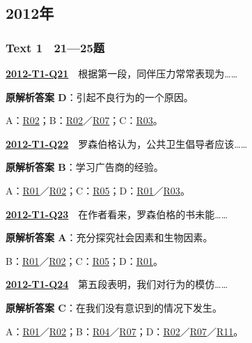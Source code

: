 \documentclass[11pt,a4paper]{article}
\begin{document}
\subsection{2012年}\label{year-2012}
\subsubsection{Text 1　21—25题}
\label{idx-2012-T1-Q21}\noindent\textbf{\href{https://zj139.github.io/math-notes/english/ff9729fa700fea3c5e7ecc04/\#q21}{2012-T1-Q21}}　根据第一段，同伴压力常常表现为……\par\nopagebreak
\noindent\textbf{原解析答案 D}：引起不良行为的一个原因。\par\nopagebreak
\noindent A：\hyperref[cat-R02]{R02}；B：\hyperref[cat-R02]{R02}／\hyperref[cat-R07]{R07}；C：\hyperref[cat-R03]{R03}。\par\smallskip
{}\label{idx-2012-T1-Q22}\noindent\textbf{\href{https://zj139.github.io/math-notes/english/ff9729fa700fea3c5e7ecc04/\#q22}{2012-T1-Q22}}　罗森伯格认为，公共卫生倡导者应该……\par\nopagebreak
\noindent\textbf{原解析答案 B}：学习广告商的经验。\par\nopagebreak
\noindent A：\hyperref[cat-R01]{R01}／\hyperref[cat-R02]{R02}；C：\hyperref[cat-R05]{R05}；D：\hyperref[cat-R01]{R01}／\hyperref[cat-R03]{R03}。\par\smallskip
{}\label{idx-2012-T1-Q23}\noindent\textbf{\href{https://zj139.github.io/math-notes/english/ff9729fa700fea3c5e7ecc04/\#q23}{2012-T1-Q23}}　在作者看来，罗森伯格的书未能……\par\nopagebreak
\noindent\textbf{原解析答案 A}：充分探究社会因素和生物因素。\par\nopagebreak
\noindent B：\hyperref[cat-R01]{R01}／\hyperref[cat-R02]{R02}；C：\hyperref[cat-R05]{R05}；D：\hyperref[cat-R01]{R01}。\par\smallskip
{}\label{idx-2012-T1-Q24}\noindent\textbf{\href{https://zj139.github.io/math-notes/english/ff9729fa700fea3c5e7ecc04/\#q24}{2012-T1-Q24}}　第五段表明，我们对行为的模仿……\par\nopagebreak
\noindent\textbf{原解析答案 C}：在我们没有意识到的情况下发生。\par\nopagebreak
\noindent A：\hyperref[cat-R01]{R01}／\hyperref[cat-R02]{R02}；B：\hyperref[cat-R04]{R04}／\hyperref[cat-R07]{R07}；D：\hyperref[cat-R02]{R02}／\hyperref[cat-R07]{R07}／\hyperref[cat-R11]{R11}。\par\smallskip
\end{document}
